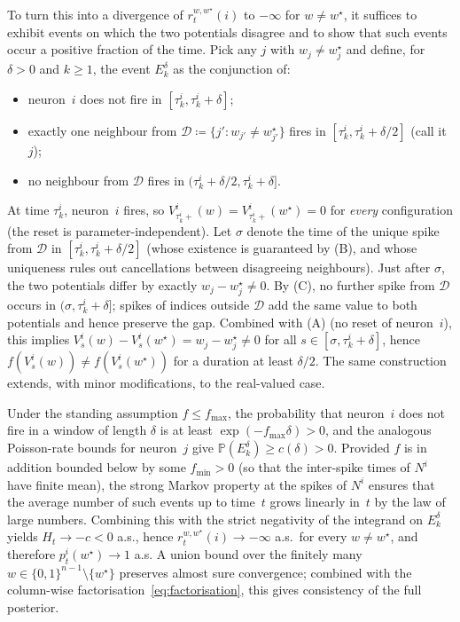 \documentclass[11pt,a4paper]{article}
\theoremstyle{definition}
\newcommand{\Prob}{\mathbb{P}}
\begin{document}
To turn this into a divergence of $r_t^{w, w^\star}(i)$ to $-\infty$
for $w \neq w^\star$, it suffices to exhibit events on which the two
potentials disagree and to show that such events occur a positive
fraction of the time. Pick any $j$ with $w_j \neq w^\star_j$ and define,
for $\delta > 0$ and $k \geq 1$, the event $E_k^\delta$ as the
conjunction of:
\begin{itemize}
  \item[\textbf{(A)}] neuron~$i$ does not fire in $[\tau_k^i, \tau_k^i + \delta]$;
  \item[\textbf{(B)}] exactly one neighbour from $\mathcal{D} \coloneqq \{j' : w_{j'} \neq w^\star_{j'}\}$ fires in $[\tau_k^i, \tau_k^i + \delta/2]$ (call it $j$);
  \item[\textbf{(C)}] no neighbour from $\mathcal{D}$ fires in $(\tau_k^i + \delta/2, \tau_k^i + \delta]$.
\end{itemize}
At time $\tau_k^i$, neuron~$i$ fires, so $V^i_{\tau_k^i+}(w) = V^i_{\tau_k^i+}(w^\star) = 0$ for \emph{every} configuration (the reset is parameter-independent). Let $\sigma$ denote the time of the unique spike from $\mathcal{D}$ in $[\tau_k^i, \tau_k^i + \delta/2]$ (whose existence is guaranteed by (B), and whose uniqueness rules out cancellations between disagreeing neighbours). Just after $\sigma$, the two potentials differ by exactly $w_j - w^\star_j \neq 0$. By (C), no further spike from $\mathcal{D}$ occurs in $(\sigma, \tau_k^i + \delta]$; spikes of indices outside $\mathcal{D}$ add the same value to both potentials and hence preserve the gap. Combined with (A) (no reset of neuron~$i$), this implies $V^i_s(w) - V^i_s(w^\star) = w_j - w^\star_j \neq 0$ for all $s \in [\sigma, \tau_k^i + \delta]$, hence $f(V_s^i(w)) \neq f(V_s^i(w^\star))$ for a duration at least $\delta/2$. The same construction extends, with minor modifications, to the real-valued case.

Under the standing assumption $f \leq f_{\max}$, the probability that
neuron~$i$ does not fire in a window of length $\delta$ is at least
$\exp(-f_{\max}\delta) > 0$, and the analogous Poisson-rate bounds for
neuron~$j$ give $\Prob(E_k^\delta) \geq c(\delta) > 0$. Provided $f$ is
in addition bounded below by some $f_{\min} > 0$ (so that the
inter-spike times of $N^i$ have finite mean), the strong Markov
property at the spikes of $N^i$ ensures that the average number of
such events up to time~$t$ grows linearly in~$t$ by the law of large
numbers. Combining this with the strict negativity of the
integrand on $E_k^\delta$ yields $H_t \to -c < 0$ a.s., hence
$r_t^{w, w^\star}(i) \to -\infty$ a.s.\ for every $w \neq w^\star$, and therefore $p_t^i(w^\star) \to 1$ a.s. A union bound over the finitely many $w \in \{0,1\}^{n-1} \setminus \{w^\star\}$ preserves almost sure convergence; combined with the column-wise factorisation~\eqref{eq:factorisation}, this gives consistency of the full posterior.
\end{document}

